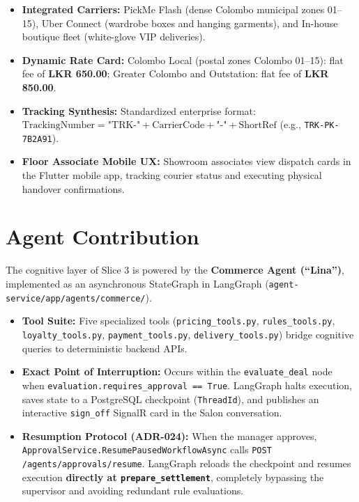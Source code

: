 \begin{itemize}
    \item \textbf{Integrated Carriers:} PickMe Flash (dense Colombo municipal zones 01--15), Uber Connect (wardrobe boxes and hanging garments), and In-house boutique fleet (white-glove VIP deliveries).
    \item \textbf{Dynamic Rate Card:} Colombo Local (postal zones Colombo 01--15): flat fee of \textbf{LKR 650.00}; Greater Colombo and Outstation: flat fee of \textbf{LKR 850.00}.
    \item \textbf{Tracking Synthesis:} Standardized enterprise format: $\text{TrackingNumber} = \text{"TRK-"} + \text{CarrierCode} + \text{"-"} + \text{ShortRef}$ (e.g., \texttt{TRK-PK-7B2A91}).
    \item \textbf{Floor Associate Mobile UX:} Showroom associates view dispatch cards in the Flutter mobile app, tracking courier status and executing physical handover confirmations.
\end{itemize}

\section{Agent Contribution}
\label{sec:c-agent}

The cognitive layer of Slice 3 is powered by the \textbf{Commerce Agent (``Lina'')}, implemented as an asynchronous StateGraph in LangGraph (\texttt{agent-service/app/agents/commerce/}).

\begin{itemize}
    \item \textbf{Tool Suite:} Five specialized tools (\texttt{pricing\_tools.py}, \texttt{rules\_tools.py}, \texttt{loyalty\_tools.py}, \texttt{payment\_tools.py}, \texttt{delivery\_tools.py}) bridge cognitive queries to deterministic backend APIs.
    \item \textbf{Exact Point of Interruption:} Occurs within the \texttt{evaluate\_deal} node when \texttt{evaluation.requires\_approval == True}. LangGraph halts execution, saves state to a PostgreSQL checkpoint (\texttt{ThreadId}), and publishes an interactive \texttt{sign\_off} SignalR card in the Salon conversation.
    \item \textbf{Resumption Protocol (ADR-024):} When the manager approves, \texttt{ApprovalService.ResumePausedWorkflowAsync} calls \texttt{POST /agents/approvals/resume}. LangGraph reloads the checkpoint and resumes execution \textbf{directly at \texttt{prepare\_settlement}}, completely bypassing the supervisor and avoiding redundant rule evaluations.
\end{itemize}

